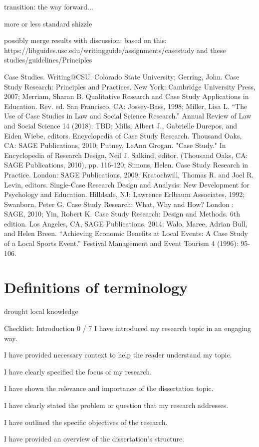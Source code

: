 transition: the way forward...




more or less standard shizzle

possibly merge results with discussion: based on this: https://libguides.usc.edu/writingguide/assignments/casestudy and these studies/guidelines/Principles

Case Studies. Writing@CSU. Colorado State University; Gerring, John. Case Study Research: Principles and Practices. New York: Cambridge University Press, 2007; Merriam, Sharan B. Qualitative Research and Case Study Applications in Education. Rev. ed. San Francisco, CA: Jossey-Bass, 1998; Miller, Lisa L. “The Use of Case Studies in Law and Social Science Research.” Annual Review of Law and Social Science 14 (2018): TBD; Mills, Albert J., Gabrielle Durepos, and Eiden Wiebe, editors. Encyclopedia of Case Study Research. Thousand Oaks, CA: SAGE Publications, 2010; Putney, LeAnn Grogan. "Case Study." In Encyclopedia of Research Design, Neil J. Salkind, editor. (Thousand Oaks, CA: SAGE Publications, 2010), pp. 116-120; Simons, Helen. Case Study Research in Practice. London: SAGE Publications, 2009; Kratochwill, Thomas R. and Joel R. Levin, editors. Single-Case Research Design and Analysis: New Development for Psychology and Education. Hilldsale, NJ: Lawrence Erlbaum Associates, 1992; Swanborn, Peter G. Case Study Research: What, Why and How? London : SAGE, 2010; Yin, Robert K. Case Study Research: Design and Methods. 6th edition. Los Angeles, CA, SAGE Publications, 2014; Walo, Maree, Adrian Bull, and Helen Breen. “Achieving Economic Benefits at Local Events: A Case Study of a Local Sports Event.” Festival Management and Event Tourism 4 (1996): 95-106.




\section{Definitions of terminology}

drought
local knowledge




Checklist: Introduction 0 / 7
I have introduced my research topic in an engaging way.

I have provided necessary context to help the reader understand my topic.

I have clearly specified the focus of my research.

I have shown the relevance and importance of the dissertation topic.

I have clearly stated the problem or question that my research addresses.

I have outlined the specific objectives of the research.

I have provided an overview of the dissertation’s structure.